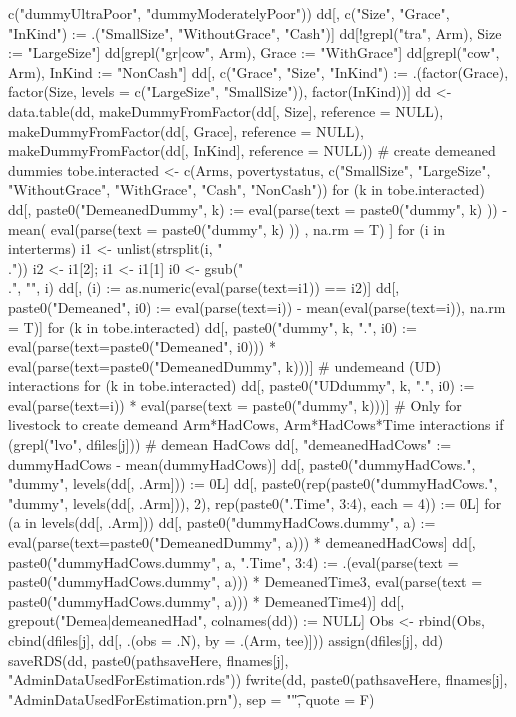 \begin{Schunk}
\begin{Sinput}
{    c("dummyUltraPoor", "dummyModeratelyPoor"))
  dd[, c("Size", "Grace", "InKind") := .("SmallSize", "WithoutGrace", "Cash")]
  dd[!grepl("tra", Arm), Size := "LargeSize"]
  dd[grepl("gr|cow", Arm), Grace := "WithGrace"]
  dd[grepl("cow", Arm), InKind := "NonCash"]
  dd[, c("Grace", "Size", "InKind") := 
    .(factor(Grace), factor(Size, levels = c("LargeSize", "SmallSize")), 
      factor(InKind))]
  dd <- data.table(dd, 
    makeDummyFromFactor(dd[, Size], reference = NULL),
    makeDummyFromFactor(dd[, Grace], reference = NULL),
    makeDummyFromFactor(dd[, InKind], reference = NULL))
  # create demeaned dummies
  tobe.interacted <- c(Arms, povertystatus, 
    c("SmallSize", "LargeSize", "WithoutGrace", "WithGrace", "Cash", "NonCash"))
  for (k in tobe.interacted)
    dd[, paste0("DemeanedDummy", k) := 
      eval(parse(text = 
        paste0("dummy", k)
      )) - 
      mean(
        eval(parse(text = 
          paste0("dummy", k)
        ))
        , na.rm = T)
    ]
  for (i in interterms) {
    i1 <- unlist(strsplit(i, "\\."))
    i2 <- i1[2]; i1 <- i1[1]
    i0 <- gsub("\\.", "", i)
    dd[, (i) := as.numeric(eval(parse(text=i1)) == i2)]
    dd[, paste0("Demeaned", i0) := 
      eval(parse(text=i)) - mean(eval(parse(text=i)), na.rm = T)] 
    for (k in tobe.interacted)
      dd[, paste0("dummy", k, ".", i0) := 
        eval(parse(text=paste0("Demeaned", i0))) * 
        eval(parse(text=paste0("DemeanedDummy", k)))]
    # undemeand (UD) interactions
    for (k in tobe.interacted)
      dd[, paste0("UDdummy", k, ".", i0) := 
        eval(parse(text=i)) * 
        eval(parse(text = paste0("dummy", k)))]
  }
  # Only for livestock to create demeand Arm*HadCows, Arm*HadCows*Time interactions 
  if (grepl("lvo", dfiles[j])) {
    # demean HadCows
    dd[, "demeanedHadCows" := dummyHadCows - mean(dummyHadCows)]
    dd[, paste0("dummyHadCows.", "dummy", levels(dd[, .Arm])) := 0L]
    dd[, paste0(rep(paste0("dummyHadCows.", "dummy", levels(dd[, .Arm])), 2),  
      rep(paste0(".Time", 3:4), each = 4)) := 0L]
    for (a in levels(dd[, .Arm])) {
      dd[, paste0("dummyHadCows.dummy", a) := 
        eval(parse(text=paste0("DemeanedDummy", a))) * demeanedHadCows]
      dd[, paste0("dummyHadCows.dummy", a, ".Time", 3:4) := 
        .(eval(parse(text = paste0("dummyHadCows.dummy", a))) * DemeanedTime3,
          eval(parse(text = paste0("dummyHadCows.dummy", a))) * DemeanedTime4)]
    }
  }
  dd[, grepout("Demea|demeanedHad", colnames(dd)) := NULL]
  Obs <- rbind(Obs, cbind(dfiles[j], dd[, .(obs = .N), by = .(Arm, tee)]))
  assign(dfiles[j], dd)
  saveRDS(dd, paste0(pathsaveHere, flnames[j], "AdminDataUsedForEstimation.rds"))
  fwrite(dd, paste0(pathsaveHere, flnames[j], "AdminDataUsedForEstimation.prn"), 
    sep = "\t", quote = F)
}
\end{Sinput}
\end{Schunk}
